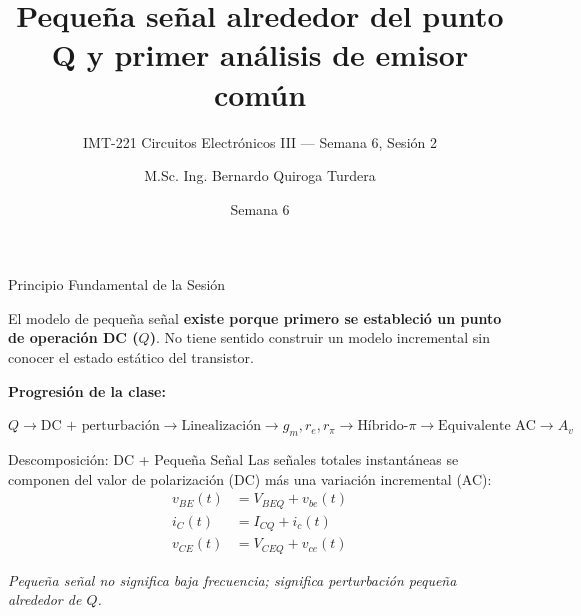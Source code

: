 \documentclass[aspectratio=169, table, xcdraw]{beamer}
\title[Pequeña Señal y Emisor Común]{Pequeña señal alrededor del punto Q y primer análisis de emisor común}
\subtitle{IMT-221 Circuitos Electrónicos III — Semana 6, Sesión 2}
\author[B. Quiroga Turdera]{M.Sc. Ing. Bernardo Quiroga Turdera}
\institute[UCB Tarija]{Universidad Católica Boliviana ``San Pablo'' — Sede Tarija}
\date{Semana 6}
\begin{document}
\begin{frame}
    \titlepage
\end{frame}

\begin{frame}{Principio Fundamental de la Sesión}
    \begin{tcolorbox}[colback=ucbblue!5, colframe=ucbblue, title=La Pequeña Señal NO reemplaza al Análisis DC]
        El modelo de pequeña señal \textbf{existe porque primero se estableció un punto de operación DC ($Q$)}. No tiene sentido construir un modelo incremental sin conocer el estado estático del transistor.
    \end{tcolorbox}
    
    \vspace{0.3cm}
    \textbf{Progresión de la clase:}
    \begin{center}
        $Q \rightarrow \text{DC + perturbación} \rightarrow \text{Linealización} \rightarrow g_m, r_e, r_\pi \rightarrow \text{Híbrido-}\pi \rightarrow \text{Equivalente AC} \rightarrow A_v$
    \end{center}
\end{frame}

\begin{frame}{Descomposición: DC + Pequeña Señal}
    Las señales totales instantáneas se componen del valor de polarización (DC) más una variación incremental (AC):
    \begin{align*}
        v_{BE}(t) &= V_{BEQ} + v_{be}(t) \\
        i_C(t) &= I_{CQ} + i_c(t) \\
        v_{CE}(t) &= V_{CEQ} + v_{ce}(t)
    \end{align*}
    
    \begin{center}
    \end{center}
    \textit{Pequeña señal no significa baja frecuencia; significa perturbación pequeña alrededor de $Q$.}
\end{frame}
\end{document}
